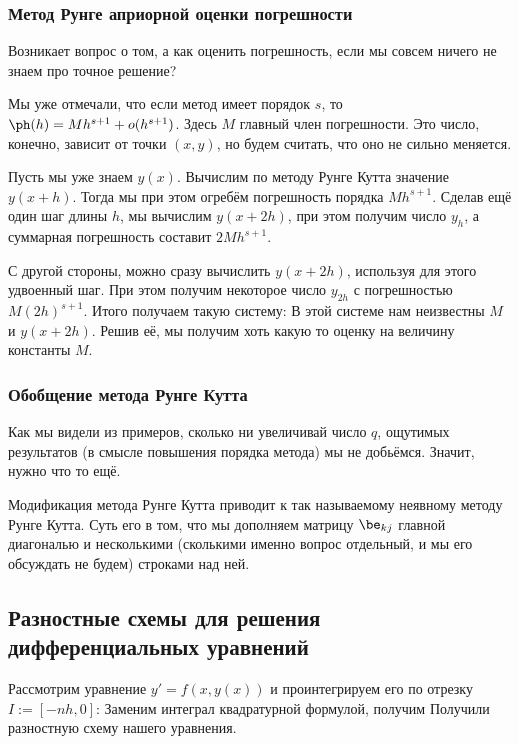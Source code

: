 \documentclass[a4paper]{article}
\newcommand{\dt}{\,dt} \newcommand{\dy}{\,dy}
\begin{document}
\subsubsection{Метод Рунге априорной оценки погрешности}

Возникает вопрос о том, а как оценить погрешность, если мы совсем
ничего не знаем про точное решение?

Мы уже отмечали, что если метод имеет порядок $s$, то $\ph(h) = M
h^{s+1} + o(h^{s+1})$.  Здесь $M$ главный член погрешности. Это число,
конечно, зависит от точки $(x,y)$, но будем считать, что оно не сильно
меняется.

Пусть мы уже знаем $y(x)$. Вычислим по методу Рунге Кутта значение
$y(x+h)$.  Тогда мы при этом огребём погрешность порядка $M
h^{s+1}$. Сделав ещё один шаг длины $h$, мы вычислим $y(x+2h)$, при
этом получим число $y_h$, а суммарная погрешность составит $2M
h^{s+1}$.

С другой стороны, можно сразу вычислить $y(x+2h)$, используя для этого
удвоенный шаг.  При этом получим некоторое число $y_{2h}$ с
погрешностью $M(2h)^{s+1}$. Итого получаем такую систему:   В этой системе нам неизвестны $M$ и $y(x
+2h)$. Решив её, мы получим хоть какую то оценку на величину константы
$M$.

\subsubsection{Обобщение метода Рунге Кутта}

Как мы видели из примеров, сколько ни увеличивай число $q$, ощутимых
результатов (в смысле повышения порядка метода) мы не
добьёмся. Значит, нужно что то ещё.

Модификация метода Рунге Кутта приводит к так называемому неявному
методу Рунге Кутта. Суть его в том, что мы дополняем матрицу
$\be_{kj}$ главной диагональю и несколькими (сколькими именно вопрос
отдельный, и мы его обсуждать не будем) строками над ней.

\subsection{Разностные схемы для решения дифференциальных уравнений}

Рассмотрим уравнение $y' = f(x,y(x))$ и проинтегрируем его по отрезку
$I := [-nh,0]$: \eqn{\ints{I} y'(x+t)\dt = \ints{I} f(x+t,
  y(x+t))\dt.}  Заменим интеграл квадратурной формулой, получим
  Получили разностную схему нашего уравнения.
\end{document}

